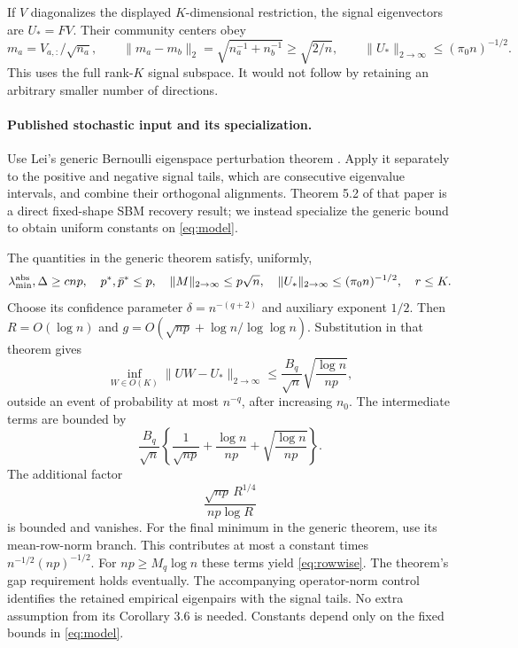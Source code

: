 \documentclass[11pt]{article}
\begin{document}
If $V$ diagonalizes the displayed $K$-dimensional restriction, the signal
eigenvectors are $U_*=FV$. Their community centers obey
\begin{equation}\label{eq:centers}
 m_a=V_{a,:}/\sqrt{n_a},\qquad
 \|m_a-m_b\|_2=\sqrt{n_a^{-1}+n_b^{-1}}\ge\sqrt{2/n},
 \qquad \|U_*\|_{2\to\infty}\le(\pi_0 n)^{-1/2}.
\end{equation}
This uses the full rank-$K$ signal subspace. It would not follow by
retaining an arbitrary smaller number of directions.

\paragraph{Published stochastic input and its specialization.}
Use Lei's generic Bernoulli eigenspace perturbation theorem
\cite[Theorem 3.4]{lei}. Apply it separately to the positive and negative
signal tails, which are consecutive eigenvalue intervals, and combine
their orthogonal alignments. Theorem 5.2 of that paper is a direct
fixed-shape SBM recovery result; we instead specialize the generic bound
to obtain uniform constants on \eqref{eq:model}.

The quantities in the generic theorem satisfy, uniformly,
\[
 \lambda_{\min}^{\rm abs},\Delta\ge cnp,\quad
 p^*,\bar p^*\le p,\quad
 \|M\|_{2\to\infty}\le p\sqrt n,\quad
 \|U_*\|_{2\to\infty}\le (\pi_0 n)^{-1/2},\quad r\le K.
\]
Choose its confidence parameter $\delta=n^{-(q+2)}$ and auxiliary exponent
$1/2$. Then $R=O(\log n)$ and
$g=O(\sqrt{np}+\log n/\log\log n)$. Substitution in that theorem gives
\begin{equation}\label{eq:rowwise}
 \inf_{W\in O(K)}\|UW-U_*\|_{2\to\infty}
 \le \frac{B_q}{\sqrt n}\sqrt{\frac{\log n}{np}},
\end{equation}
outside an event of probability at most $n^{-q}$, after increasing $n_0$.
The intermediate terms are bounded by
\[
\frac{B_q}{\sqrt n}\left\{\frac{1}{\sqrt{np}}+
\frac{\log n}{np}+\sqrt{\frac{\log n}{np}}\right\}.
\]
The additional factor
\[
 \frac{\sqrt{np}\,R^{1/4}}{np\log R}
\]
is bounded and vanishes. For the final minimum in the generic theorem,
use its mean-row-norm branch. This contributes at most a constant times
$n^{-1/2}(np)^{-1/2}$.
For $np\ge M_q\log n$ these terms yield \eqref{eq:rowwise}.
The theorem's gap requirement holds eventually. The accompanying
operator-norm control identifies the retained empirical eigenpairs with
the signal tails. No extra assumption from its Corollary 3.6
is needed. Constants depend only on the fixed bounds in \eqref{eq:model}.
\end{document}
